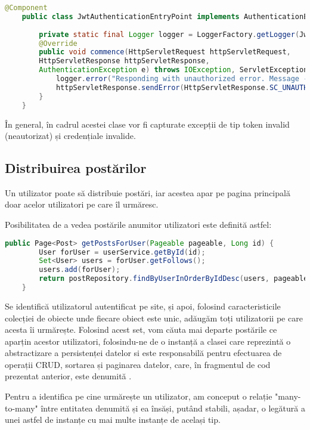 \begin{lstlisting}[language=Java]
	@Component
	public class JwtAuthenticationEntryPoint implements AuthenticationEntryPoint {
		
		private static final Logger logger = LoggerFactory.getLogger(JwtAuthenticationEntryPoint.class);
		@Override
		public void commence(HttpServletRequest httpServletRequest,
		HttpServletResponse httpServletResponse,
		AuthenticationException e) throws IOException, ServletException {
			logger.error("Responding with unauthorized error. Message - {}", e.getMessage());
			httpServletResponse.sendError(HttpServletResponse.SC_UNAUTHORIZED, e.getMessage());
		}
	}
\end{lstlisting}
\bigskip
În general, în cadrul acestei clase vor fi capturate excepții de tip token invalid (neautorizat) și credențiale invalide.\newline

\subsection{Distribuirea postărilor}
Un utilizator poate să distribuie postări, iar acestea apar pe pagina principală doar acelor utilizatori pe care îl urmăresc.\newline

Posibilitatea de a vedea postările anumitor utilizatori este definită astfel:\newline

\begin{lstlisting}[language=Java]
	public Page<Post> getPostsForUser(Pageable pageable, Long id) {
		User forUser = userService.getById(id);
		Set<User> users = forUser.getFollows();
		users.add(forUser);
		return postRepository.findByUserInOrderByIdDesc(users, pageable);
	}
\end{lstlisting}
\bigskip
Se identifică utilizatorul autentificat pe site, și apoi, folosind caracteristicile colecției de obiecte  unde fiecare obiect este unic, adăugăm toți utilizatorii pe care acesta îi urmărește. Folosind acest set, vom căuta mai departe postările ce aparțin acestor utilizatori, folosindu-ne de o instanță a clasei care reprezintă o abstractizare a persistenței datelor si este responsabilă pentru efectuarea de operații CRUD, sortarea și paginarea datelor, care, în fragmentul de cod prezentat anterior, este denumită .\newline

Pentru a identifica pe cine urmărește un utilizator, am conceput o relație "many-to-many" între entitatea denumită  și ea însăși, putând stabili, așadar, o legătură a unei astfel de instanțe cu mai multe instanțe de același tip.\newline


